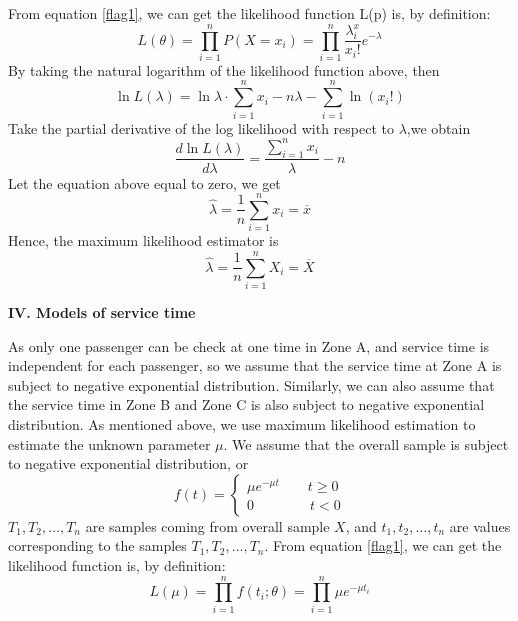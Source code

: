 \documentclass{mcmthesis}
\begin{document}
		From equation \eqref{flag1}, we can get the likelihood function L(p) is, by definition:
			\begin{equation}
				L(\theta) = \prod_{i=1}^{n}P(X=x_i) = \prod_{i=1}^{n} {\frac{{\lambda}^x_i}{x_i!}}e^{-\lambda}
			\end{equation}
		By taking  the natural logarithm of the likelihood function above, then
			$${\ln L(\lambda) = \ln {\lambda} \cdot \sum_{i=1}^{n}x_i-n\lambda- \sum_{i=1}^{n}\ln (x_i!)}$$
		Take the partial derivative of the log likelihood with respect to ${\lambda}$,we obtain
			$${\frac {d \ln L(\lambda)}{d \lambda} = \frac {\sum\limits_{i=1}^{n}x_i}{\lambda} -n}$$
		Let the equation above equal to zero, we get
			\begin{equation}
				\hat \lambda = \frac{1}{n} \sum_{i=1}^{n}x_i = \overline x
 			\end{equation}
		Hence, the  maximum likelihood estimator is
			\begin{equation}
				\hat \lambda = \frac{1}{n} \sum_{i=1}^{n}X_i = \overline X
			\end{equation}
		\par{\bf IV. Models of service time}%
		\par As only one passenger can be check at one time in Zone A, and service time is independent for each passenger, so we assume that the service time at Zone A is subject to negative exponential distribution. Similarly, we can also assume that the service time in Zone B and Zone C is also subject to negative exponential distribution. As mentioned above, we use maximum likelihood estimation to estimate the unknown parameter ${\mu}$.
		We assume that the overall sample is subject to negative exponential distribution, or
			\begin{equation}    
				f(t)=\left  \{
      					 \begin{array}{lr}
        					   \mu e^{-\mu t}\qquad t\geqslant 0\\
         				   0\qquad\qquad t<0
       			 		\end{array}
				\right.
			\end{equation}
		${T_1, T_2, \dots , T_n}$ are samples coming from overall sample ${X}$, and ${t_1, t_2, \dots , t_n}$ are values corresponding to the samples  ${T_1, T_2, \dots , T_n}$. 
		From equation \eqref{flag1}, we can get the likelihood function is, by definition:
			\begin{equation}
				L(\mu ) = \prod_{i=1}^{n} f(t_i; \theta) = \prod_{i=1}^{n}\mu e^{- \mu t_i}
			\end{equation}
\end{document}
